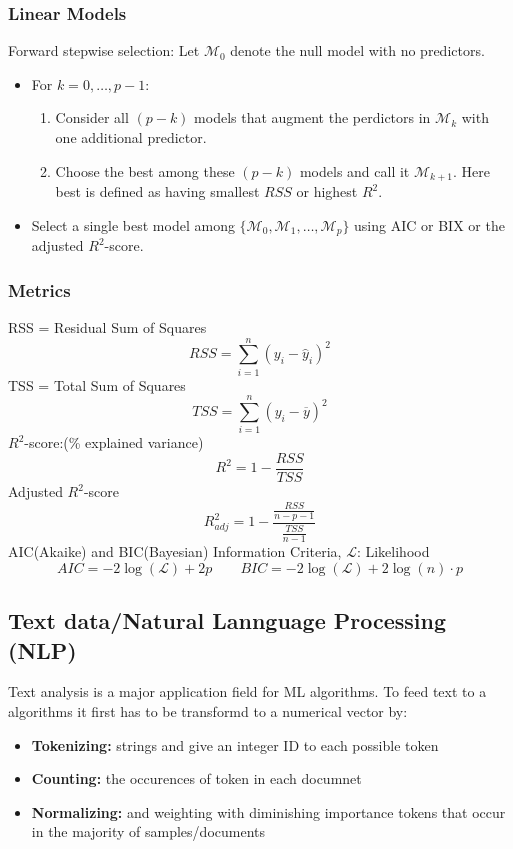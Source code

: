 \subsubsection*{Linear Models}
Forward stepwise selection:
Let \(\mathcal{M}_0\) denote the null model with no predictors.
\begin{itemize}
    \item For \(k = 0,\dots,p-1\):
    \begin{enumerate}
        \item Consider all \((p-k)\) models that augment the perdictors in \(\mathcal{M}_k\) with one additional predictor.
        \item Choose the best among these \((p-k)\) models and call it \(\mathcal{M}_{k + 1}\). Here best is defined as having smallest \(RSS\) or highest \(R^2\).
    \end{enumerate}
    \item Select a single best model among \(\{\mathcal{M}_{0},\mathcal{M}_{1},\dots,\mathcal{M}_{p}\}\) using AIC or BIX or the adjusted \(R^2\)-score.
\end{itemize}
\subsubsection*{Metrics}
RSS = Residual Sum of Squares
\[
RSS = \sum_{i = 1}^{n}(y_i-\hat{y}_i)^2
\]
TSS = Total Sum of Squares
\[
    TSS = \sum_{i = 1}^{n}(y_i-\overline{y})^2
\]
\(R^2\)-score:(\% explained variance)
\[
R^2 = 1- \frac{RSS}{TSS}
\]
Adjusted \(R^2\)-score
\[
R^2_{adj} =  1- \frac{\frac{RSS}{n-p-1}}{\frac{TSS}{n-1}}
\]
AIC(Akaike) and BIC(Bayesian) Information Criteria, \(\mathcal{L}\): Likelihood
\[
AIC = -2\log(\mathcal{L}) + 2p \qquad BIC = -2\log(\mathcal{L}) + 2\log(n) \cdot p
\]

\subsection{Text data/Natural Lannguage Processing (NLP)}
Text analysis is a major application field for ML algorithms.
To feed text to a algorithms it first has to be transformd to a numerical vector by:
\begin{itemize}
    \item \textbf{Tokenizing:} strings and give an integer ID to each possible token
    \item \textbf{Counting:} the occurences of token in each documnet
    \item \textbf{Normalizing:} and weighting with diminishing importance tokens that occur in the majority of samples/documents
\end{itemize}
